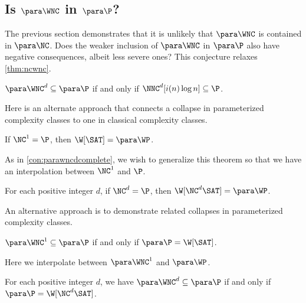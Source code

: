 \documentclass{article}
\begin{document}
\subsection{Is \texorpdfstring{$\para \WNC$}{paraWNC} in \texorpdfstring{$\para \P$}{paraP}?}
\label{sec:wncp}

The previous section demonstrates that it is unlikely that $\para \WNC$ is contained in $\para \NC$.
Does the weaker inclusion of $\para \WNC$ in $\para \P$ also have negative consequences, albeit less severe ones?
This conjecture relaxes \autoref{thm:ncwnc}.

\begin{conjecture}\label{con:wncp}
  $\para \WNC^d \subseteq \para \P$ if and only if $\NNC^d[i(n) \log n] \subseteq \P$.
\end{conjecture}

Here is an alternate approach that connects a collapse in parameterized complexity classes to one in classical complexity classes.

\begin{theorem}
  If $\NC^1 = \P$, then $\W[\SAT] = \para \WP$.
\end{theorem}

As in \autoref{con:parawncdcomplete}, we wish to generalize this theorem so that we have an interpolation between $\NC^1$ and $\P$.

\begin{conjecture}
  For each positive integer $d$, if $\NC^d = \P$, then $\W[\NC^d \SAT] = \para \WP$.
\end{conjecture}

An alternative approach is to demonstrate related collapses in parameterized complexity classes.

\begin{theorem}
  $\para \WNC^1 \subseteq \para \P$ if and only if $\para \P = \W[\SAT]$.
\end{theorem}

Here we interpolate between $\para \WNC^1$ and $\para \WP$.

\begin{conjecture}
  For each positive integer $d$, we have $\para \WNC^d \subseteq \para \P$ if and only if $\para \P = \W[\NC^d \SAT]$.
\end{conjecture}
\end{document}
